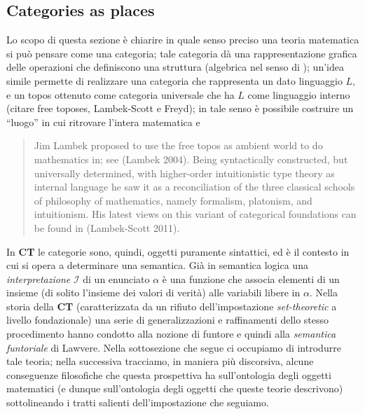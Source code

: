 \documentclass{amsart}
\begin{document}
\subsection{Categories as places}
Lo scopo di questa sezione è chiarire in quale senso preciso una teoria matematica si può pensare come una categoria; tale categoria dà una rappresentazione grafica delle operazioni che definiscono una struttura (algebrica nel senso di \cite{Kurosh:o:altri}); un'idea simile permette di realizzare una categoria che rappresenta un dato linguaggio $L$, e un topos ottenuto come categoria universale che ha $L$ come linguaggio interno (citare free toposes, Lambek-Scott e Freyd); in tale senso è possibile costruire un ``luogo'' in cui ritrovare l'intera matematica e 
\begin{quote}
  Jim Lambek proposed to use the free topos as ambient world to do mathematics in; see (Lambek 2004). Being syntactically constructed, but universally determined, with higher-order intuitionistic type theory as internal language he saw it as a reconciliation of the three classical schools of philosophy of mathematics, namely formalism, platonism, and intuitionism. His latest views on this variant of categorical foundations can be found in (Lambek-Scott 2011).
\end{quote}
In \textbf{CT} le categorie sono, quindi, oggetti puramente sintattici, ed è il contesto in cui si opera a determinare una semantica. Già in semantica logica una \emph{interpretazione} $\mathcal{I}$ di un enunciato $\alpha$ è una funzione che associa elementi di un insieme (di solito l'insieme dei valori di verità) alle variabili libere in $\alpha$. Nella storia della \textbf{CT} (caratterizzata da un rifiuto dell'impostazione \emph{set-theoretic} a livello fondazionale) una serie di generalizzazioni e raffinamenti dello stesso procedimento hanno condotto alla nozione di funtore e quindi alla \emph{semantica funtoriale} di Lawvere. Nella sottosezione che segue ci occupiamo di introdurre tale teoria; nella successiva tracciamo, in maniera più discorsiva, alcune conseguenze filosofiche che questa prospettiva ha sull'ontologia degli oggetti matematici (e dunque sull'ontologia degli oggetti che queste teorie descrivono) sottolineando i tratti salienti dell'impostazione che seguiamo.
\end{document}
